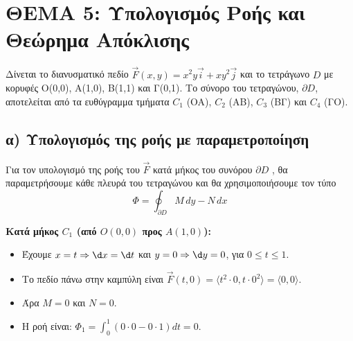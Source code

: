 \documentclass[a4paper,12pt,twoside]{article}
\begin{document}
\section*{ΘΕΜΑ 5: Υπολογισμός Ροής και Θεώρημα Απόκλισης}

\noindent
Δίνεται το διανυσματικό πεδίο $\vec{F}(x, y) = x^2 y \vec{i} + xy^2 \vec{j}$ και το τετράγωνο $D$ με κορυφές O(0,0), A(1,0), B(1,1) και Γ(0,1). Το σύνορο του τετραγώνου, $\partial D$, αποτελείται από τα ευθύγραμμα τμήματα $C_1$ (OA), $C_2$ (AB), $C_3$ (BΓ) και $C_4$ (ΓΟ).

\begin{center}
\end{center}

\subsection*{α) Υπολογισμός της ροής με παραμετροποίηση}
Για τον υπολογισμό της ροής του $\vec{F}$ κατά μήκος του συνόρου $\partial D$ , θα παραμετρήσουμε κάθε πλευρά του τετραγώνου και θα χρησιμοποιήσουμε τον τύπο \[ \Phi = \oint_{\partial D} M \, dy - N \, dx\]

\noindent\textbf{Κατά μήκος $C_1$ (από $O(0,0)$ προς $A(1,0)$):}
\begin{itemize}
    \item Έχουμε $x = t \Rightarrow \d x=\d t$ και $y = 0 \Rightarrow \d y = 0$, για $0 \le t \le 1$.
    \item Το πεδίο πάνω στην καμπύλη είναι $\vec{F}(t, 0) = \langle t^2 \cdot 0, t \cdot 0^2 \rangle = \langle 0, 0 \rangle$.
    \item Άρα $M=0$ και $N=0$.
    \item Η ροή είναι: $\Phi_1 = \int_0^1 (0 \cdot 0 - 0 \cdot 1) dt = 0$.
\end{itemize}
\end{document}
